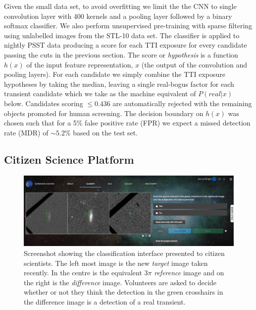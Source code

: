 \documentclass[a4paper,fleqn,usenatbib]{mnras}
\begin{document}
Given the small data set, to avoid overfitting we limit the the CNN to single convolution layer with 400 kernels and a pooling layer followed by a binary softmax classifier.  We also perform unsupervised pre-training with sparse filtering \citet{Ngiam11} using unlabelled images from the STL-10 \citep{Coates11} data set.  The classifier is applied to nightly PSST data producing a score for each TTI exposure for every candidate passing the cuts in the previous section.  The score or \textit{hypothesis} is a function $h(x)$ of the input feature representation, $x$ (the output of the convolution and pooling layers).  For each candidate we simply combine the TTI exposure hypotheses by taking the median, leaving a single real-bogus factor for each transient candidate which we take as the machine equivalent of $P(real|x)$ below.  Candidates scoring $\leq 0.436$ are automatically rejected with the remaining objects promoted for human screening.  The decision boundary on $h(x)$ was chosen such that for a 5\% false positive rate (FPR) we expect a missed detection rate (MDR) of $\sim5.2$\% based on
the test set.

\subsection{Citizen Science Platform}


\begin{figure}
   \begin{minipage}{140mm}
   \includegraphics[width=140mm]{figs/sn_hunters.png}
   \caption{Screenshot showing the classification interface presented to citizen scientists.  The left most image is the new \textit{target} image taken recently.  In the centre is the equivalent $3\pi$ \textit{reference} image and on the right is the \textit{difference} image.  Volunteers are asked to decide whether or not they think the detection in the green crosshairs in the difference image is a
detection of a real transient.} 
   \label{fig:sn_hunters}
   \end{minipage}
\end{figure}
\end{document}
